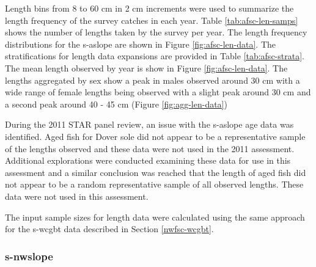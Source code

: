 \documentclass[11pt,
  english,
  a4paper,
]{article}
\begin{document}
\leavevmode\tagmcend\tagstructend\par


Length bins from 8 to 60 cm in 2 cm increments were used to summarize the length frequency of the survey catches in each year. Table \ref{tab:afsc-len-samps} shows the number of lengths taken by the survey per year. The length frequency distributions for the \gls{s-aslope} are shown in Figure \ref{fig:afsc-len-data}. The stratifications for length data expansions are provided in Table \ref{tab:afsc-strata}. The mean length observed by year is show in Figure \ref{fig:afsc-len-data}. The lengths aggregated by sex show a peak in males observed around 30 cm with a wide range of female lengths being observed with a slight peak around 30 cm and a second peak around 40 - 45 cm (Figure \ref{fig:agg-len-data})

\leavevmode\tagmcend\tagstructend\par


During the 2011 STAR panel review, an issue with the \gls{s-aslope} age data was identified. Aged fish for Dover sole did not appear to be a representative sample of the lengths observed and these data were not used in the 2011 assessment. Additional explorations were conducted examining these data for use in this assessment and a similar conclusion was reached that the length of aged fish did not appear to be a random representative sample of all observed lengths. These data were not used in this assessment.

\leavevmode\tagmcend\tagstructend\par


The input sample sizes for length data were calculated using the same approach for the \gls{s-wcgbt} data described in Section \ref{nwfsc-wcgbt}.

\leavevmode\tagmcend\tagstructend\par


\hypertarget{section-2}{%
\subsubsection{\texorpdfstring{\acrlong{s-nwslope}}{}}\label{section-2}}
\end{document}
